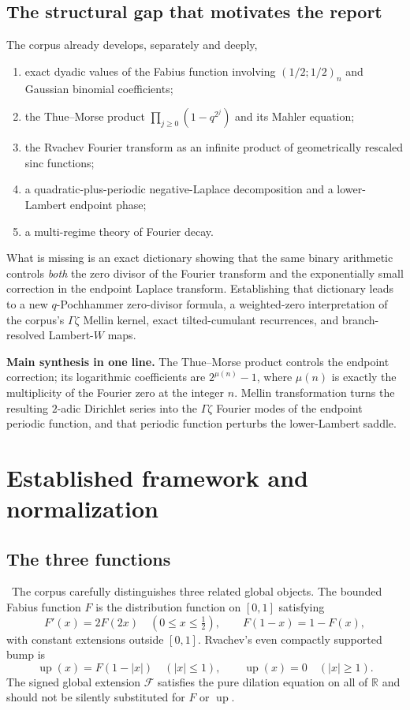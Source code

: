 \documentclass[11pt]{article}
\numberwithin{equation}{section}
\theoremstyle{definition}
\theoremstyle{remark}
\newcommand{\R}{\mathbb R}
\newcommand{\Up}{\operatorname{up}}
\begin{document}
\subsection{The structural gap that motivates the report}
The corpus already develops, separately and deeply,
\begin{enumerate}
\item exact dyadic values of the Fabius function involving $(1/2;1/2)_n$ and Gaussian
binomial coefficients;
\item the Thue--Morse product $\prod_{j\ge0}(1-q^{2^j})$ and its Mahler equation;
\item the Rvachev Fourier transform as an infinite product of geometrically rescaled sinc
functions;
\item a quadratic-plus-periodic negative-Laplace decomposition and a lower-Lambert endpoint
phase;
\item a multi-regime theory of Fourier decay.
\end{enumerate}
What is missing is an exact dictionary showing that the same binary arithmetic controls
\emph{both} the zero divisor of the Fourier transform and the exponentially small correction
in the endpoint Laplace transform.  Establishing that dictionary leads to a new
$q$-Pochhammer zero-divisor formula, a weighted-zero interpretation of the corpus's
$\Gamma\zeta$ Mellin kernel, exact tilted-cumulant recurrences, and branch-resolved
Lambert-$W$ maps.

\begin{boxedremark}
\textbf{Main synthesis in one line.}
The Thue--Morse product controls the endpoint correction; its logarithmic coefficients are
$2^{\mu(n)}-1$, where $\mu(n)$ is exactly the multiplicity of the Fourier zero at the integer
$n$.  Mellin transformation turns the resulting $2$-adic Dirichlet series into the
$\Gamma\zeta$ Fourier modes of the endpoint periodic function, and that periodic function
perturbs the lower-Lambert saddle.
\end{boxedremark}

\section{Established framework and normalization}

\subsection{The three functions}
\statusE\ The corpus carefully distinguishes three related global objects.
The bounded Fabius function $F$ is the distribution function on $[0,1]$ satisfying
\[
 F'(x)=2F(2x)\quad(0\le x\le\tfrac12),\qquad
 F(1-x)=1-F(x),
\]
with constant extensions outside $[0,1]$.  Rvachev's even compactly supported bump is
\[
 \Up(x)=F(1-|x|)\quad(|x|\le1),\qquad \Up(x)=0\quad(|x|\ge1).
\]
The signed global extension $\mathcal F$ satisfies the pure dilation equation on all of
$\R$ and should not be silently substituted for $F$ or $\Up$.
\end{document}
